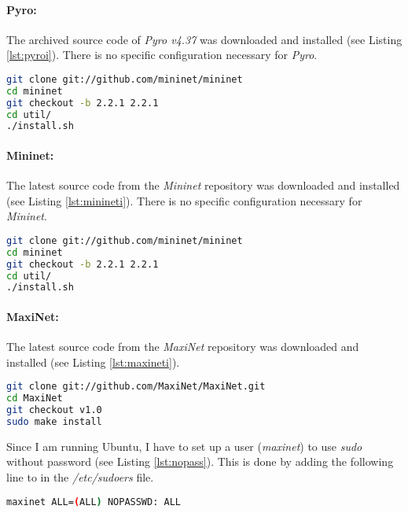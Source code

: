 \paragraph{Pyro:} 
The archived source code of \textit{Pyro v4.37} was downloaded and installed (see Listing \ref{lst:pyroi}). There is no specific configuration necessary for \textit{Pyro}.
\begin{lstlisting}[caption={Pyro installation},label={lst:pyroi},language=bash,tabsize=2,basicstyle=\footnotesize,breaklines=true,showspaces=false,showstringspaces=false,showtabs=false,frame=single]
git clone git://github.com/mininet/mininet
cd mininet
git checkout -b 2.2.1 2.2.1
cd util/
./install.sh
\end{lstlisting}

\paragraph{Mininet:} 
The latest source code from the \textit{Mininet} repository was downloaded and installed (see Listing \ref{lst:minineti}). There is no specific configuration necessary for \textit{Mininet}.
\begin{lstlisting}[caption={Mininet installation},label={lst:minineti},language=bash,tabsize=2,basicstyle=\footnotesize,breaklines=true,showspaces=false,showstringspaces=false,showtabs=false,frame=single]
git clone git://github.com/mininet/mininet
cd mininet
git checkout -b 2.2.1 2.2.1
cd util/
./install.sh
\end{lstlisting}

\paragraph{MaxiNet:} 
The latest source code from the \textit{MaxiNet} repository was downloaded and installed (see Listing \ref{lst:maxineti}).
\begin{lstlisting}[caption={MaxiNet installation},label={lst:maxineti},language=bash,tabsize=2,basicstyle=\footnotesize,breaklines=true,showspaces=false,showstringspaces=false,showtabs=false,frame=single]
git clone git://github.com/MaxiNet/MaxiNet.git
cd MaxiNet
git checkout v1.0
sudo make install
\end{lstlisting}

Since I am running Ubuntu, I have to set up a user (\textit{maxinet}) to use \textit{sudo} without password (see Listing \ref{lst:nopass}). This is done by adding the following line to in the \textit{/etc/sudoers} file.
\begin{lstlisting}[caption={Set no password},label={lst:nopass},language=bash,tabsize=2,basicstyle=\footnotesize,breaklines=true,showspaces=false,showstringspaces=false,showtabs=false,frame=single]
maxinet ALL=(ALL) NOPASSWD: ALL
\end{lstlisting}

